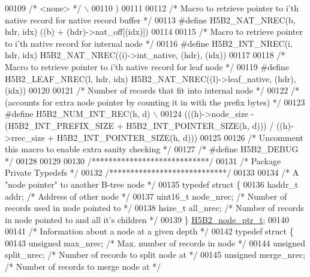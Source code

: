 \begin{DoxyCode}
{{00109 \textcolor{preprocessor}{    }\textcolor{comment}{/* <none> */}\textcolor{preprocessor}{                                                              \(\backslash\)}
00110 \textcolor{preprocessor}{    )}
00111 
00112 \textcolor{comment}{/* Macro to retrieve pointer to i'th native record for native record buffer */}
00113 \textcolor{preprocessor}{#define H5B2\_NAT\_NREC(b, hdr, idx)  ((b) + (hdr)->nat\_off[(idx)])}
00114 
00115 \textcolor{comment}{/* Macro to retrieve pointer to i'th native record for internal node */}
00116 \textcolor{preprocessor}{#define H5B2\_INT\_NREC(i, hdr, idx)  H5B2\_NAT\_NREC((i)->int\_native, (hdr), (idx))}
00117 
00118 \textcolor{comment}{/* Macro to retrieve pointer to i'th native record for leaf node */}
00119 \textcolor{preprocessor}{#define H5B2\_LEAF\_NREC(l, hdr, idx)  H5B2\_NAT\_NREC((l)->leaf\_native, (hdr), (idx))}
00120 
00121 \textcolor{comment}{/* Number of records that fit into internal node */}
00122 \textcolor{comment}{/* (accounts for extra node pointer by counting it in with the prefix bytes) */}
00123 \textcolor{preprocessor}{#define H5B2\_NUM\_INT\_REC(h, d) \(\backslash\)}
00124 \textcolor{preprocessor}{    (((h)->node\_size - (H5B2\_INT\_PREFIX\_SIZE + H5B2\_INT\_POINTER\_SIZE(h, d))) / ((h)->rrec\_size +
       H5B2\_INT\_POINTER\_SIZE(h, d)))}
00125 
00126 \textcolor{comment}{/* Uncomment this macro to enable extra sanity checking */}
00127 \textcolor{comment}{/* #define H5B2\_DEBUG */}
00128 
00129 
00130 \textcolor{comment}{/****************************/}
00131 \textcolor{comment}{/* Package Private Typedefs */}
00132 \textcolor{comment}{/****************************/}
00133 
00134 \textcolor{comment}{/* A "node pointer" to another B-tree node */}
00135 \textcolor{keyword}{typedef} \textcolor{keyword}{struct }\{
00136     haddr\_t     addr;           \textcolor{comment}{/* Address of other node */}
00137     uint16\_t    node\_nrec;      \textcolor{comment}{/* Number of records used in node pointed to */}
00138     hsize\_t     all\_nrec;       \textcolor{comment}{/* Number of records in node pointed to and all it's children */}
00139 \} \hyperlink{struct_h5_b2__node__ptr__t}{H5B2\_node\_ptr\_t};
00140 
00141 \textcolor{comment}{/* Information about a node at a given depth */}
00142 \textcolor{keyword}{typedef} \textcolor{keyword}{struct }\{
00143     \textcolor{keywordtype}{unsigned}    max\_nrec;       \textcolor{comment}{/* Max. number of records in node */}
00144     \textcolor{keywordtype}{unsigned}    split\_nrec;     \textcolor{comment}{/* Number of records to split node at */}
00145     \textcolor{keywordtype}{unsigned}    merge\_nrec;     \textcolor{comment}{/* Number of records to merge node at */}
}}
\end{DoxyCode}
